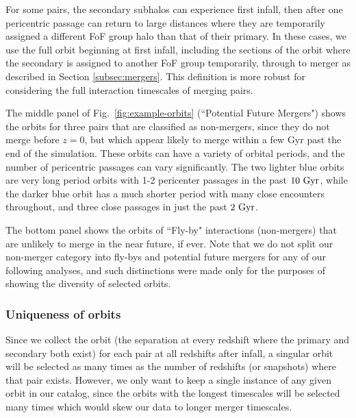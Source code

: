 \documentclass[twocolumn,linenumbers]{aastex631}
\begin{document}
For some pairs, the secondary subhalos can experience first infall, then after one pericentric passage can return to large distances where they are temporarily assigned a different FoF group halo than that of their primary. 
In these cases, we use the full orbit beginning at first infall, including the sections of the orbit where the secondary is assigned to another FoF group temporarily,  through to merger as described in Section \ref{subsec:mergers}.
This definition is more robust for considering the full interaction timescales of merging pairs.

The middle panel of Fig.~\ref{fig:example-orbits} (``Potential Future Mergers") shows the orbits for three pairs that are classified as non-mergers, since they do not merge before $z=0$, but which appear likely to merge within a few Gyr past the end of the simulation. 
These orbits can have a variety of orbital periods, and the number of pericentric passages can vary significantly. 
The two lighter blue orbits are very long period orbits with 1-2 pericenter passages in the past $10\,\mathrm{\,Gyr}$, while the darker blue orbit has a much shorter period with many close encounters throughout, and three close passages in just the past $2\,\mathrm{\,Gyr}$.

The bottom panel shows the orbits of ``Fly-by" interactions (non-mergers) that are unlikely to merge in the near future, if ever.  
Note that we do not split our non-merger category into fly-bys and potential future mergers for any of our following analyses, and such distinctions were made only for the purposes of showing the diversity of selected orbits.


\subsubsection{Uniqueness of orbits}
\label{sec:methods-unique}
Since we collect the orbit (the separation at every redshift where the primary and secondary both exist) for each pair at all redshifts after infall, a singular orbit will be selected as many times as the number of redshifts (or snapshots) where that pair exists. However, we only want to keep a single instance of any given orbit in our catalog, since the orbits with the longest timescales will be selected many times which would skew our data to longer merger timescales.
\end{document}
